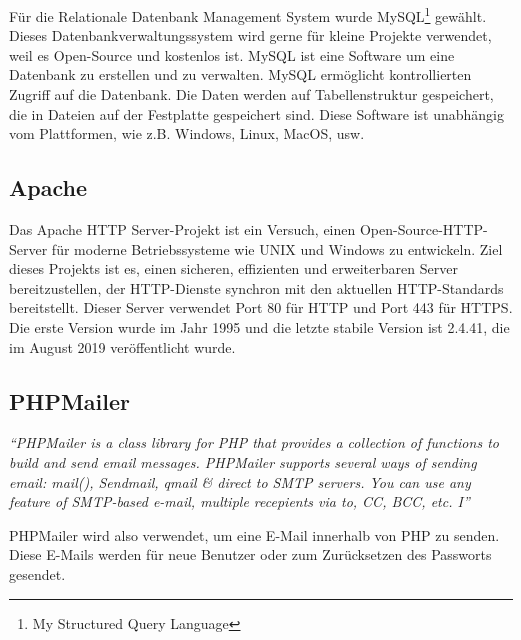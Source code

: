 F\"{u}r die Relationale Datenbank Management System wurde MySQL\footnote{My Structured Query Language} gew\"{a}hlt. Dieses Datenbankverwaltungssystem wird gerne f\"{u}r kleine Projekte verwendet, weil es Open-Source und kostenlos ist. MySQL ist eine Software um eine Datenbank zu erstellen und zu verwalten. MySQL erm\"{o}glicht kontrollierten Zugriff auf die Datenbank. Die Daten werden auf Tabellenstruktur gespeichert, die in Dateien auf der Festplatte gespeichert sind. Diese Software ist unabh\"angig vom Plattformen, wie z.B. Windows, Linux, MacOS, usw. \cite{40_mysql1}


\subsection{Apache}

Das Apache HTTP Server-Projekt ist ein Versuch, einen Open-Source-HTTP-Server f\"{u}r moderne Betriebssysteme wie UNIX und Windows zu entwickeln. Ziel dieses Projekts ist es, einen sicheren, effizienten und erweiterbaren Server bereitzustellen, der HTTP-Dienste synchron mit den aktuellen HTTP-Standards bereitstellt. Dieser Server verwendet Port 80 f\"{u}r HTTP und Port 443 f\"{u}r HTTPS. Die erste Version wurde im Jahr 1995 und die letzte stabile Version ist 2.4.41, die im August 2019 ver\"{o}ffentlicht wurde. \cite{40_apache}


\subsection{PHPMailer}
\textit{``PHPMailer is a class library for PHP that provides a collection of functions to build and send email messages. PHPMailer supports several ways of sending email: mail(), Sendmail, qmail \& direct to SMTP servers. You can use any feature of SMTP-based e-mail, multiple recepients via to, CC, BCC, etc. I''} \cite{40_phpmailer}

PHPMailer wird also verwendet, um eine E-Mail innerhalb von PHP zu senden. Diese E-Mails werden für neue Benutzer oder zum Zurücksetzen des Passworts gesendet.

